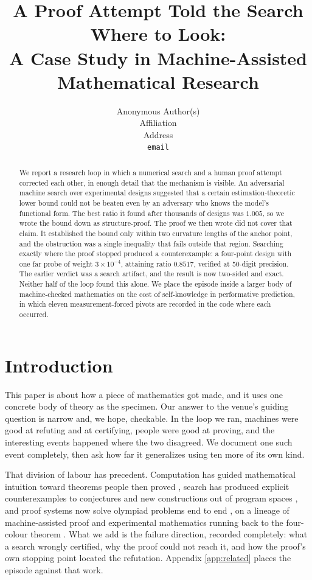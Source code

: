\documentclass{article}
\title{A Proof Attempt Told the Search Where to Look:\\
A Case Study in Machine-Assisted Mathematical Research}
\author{%
  Anonymous Author(s) \\
  Affiliation \\
  Address \\
  \texttt{email} \\
}
\begin{document}
\maketitle

\begin{abstract}
We report a research loop in which a numerical search and a human proof
attempt corrected each other, in enough detail that the mechanism is
visible. An adversarial machine search over experimental designs suggested
that a certain estimation-theoretic lower bound could not be beaten even by
an adversary who knows the model's functional form. The best ratio it found
after thousands of designs was $1.005$, so we wrote the bound down as
structure-proof. The proof we then wrote did not cover that claim. It
established the bound only within two curvature lengths of the anchor point,
and the obstruction was a single inequality that fails outside that region.
Searching exactly where the proof stopped produced a counterexample: a
four-point design with one far probe of weight $3\times 10^{-4}$, attaining
ratio $0.8517$, verified at 50-digit precision. The earlier verdict was a
search artifact, and the result is now two-sided and exact. Neither half of
the loop found this alone. We place the episode inside a larger body of
machine-checked mathematics on the cost of self-knowledge in performative
prediction, in which eleven measurement-forced pivots are recorded in the
code where each occurred.
\end{abstract}

\section{Introduction}
\label{sec:intro}

This paper is about how a piece of mathematics got made, and it uses one
concrete body of theory as the specimen. Our answer to the venue's guiding
question is narrow and, we hope, checkable. In the loop we ran, machines were
good at refuting and at certifying, people were good at proving, and the
interesting events happened where the two disagreed. We document one such
event completely, then ask how far it generalizes using ten more of its own
kind.

That division of labour has precedent. Computation has guided mathematical
intuition toward theorems people then proved \citep{davies2021advancing},
search has produced explicit counterexamples to conjectures
\citep{wagner2021constructions} and new constructions out of program spaces
\citep{romera2024mathematical}, and proof systems now solve olympiad problems
end to end \citep{trinh2024solving,hubert2025olympiad}, on a lineage of
machine-assisted proof and experimental mathematics running back to the
four-colour theorem
\citep{appel1977every,borwein2008mathematics,hales2017formal}. What we add is
the failure direction, recorded completely: what a search wrongly certified,
why the proof could not reach it, and how the proof's own stopping point
located the refutation. Appendix \ref{app:related} places the episode against
that work.
\end{document}
